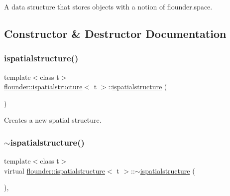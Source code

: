 A data structure that stores objects with a notion of flounder.\+space. 



\subsection{Constructor \& Destructor Documentation}
\mbox{\label{classflounder_1_1ispatialstructure_a0dbd26803384536ee69667f057b0d436}} 
\subsubsection{\texorpdfstring{ispatialstructure()}{ispatialstructure()}}
{\footnotesize\ttfamily template$<$class t$>$ \\
\hyperlink{classflounder_1_1ispatialstructure}{flounder\+::ispatialstructure}$<$ t $>$\+::\hyperlink{classflounder_1_1ispatialstructure}{ispatialstructure} (\begin{DoxyParamCaption}{ }\end{DoxyParamCaption})\hspace{0.3cm}{\ttfamily [inline]}}



Creates a new spatial structure. 

\mbox{\label{classflounder_1_1ispatialstructure_a355b10082dc172d15e1adbadba6c7f2b}} 
\subsubsection{\texorpdfstring{$\sim$ispatialstructure()}{~ispatialstructure()}}
{\footnotesize\ttfamily template$<$class t$>$ \\
virtual \hyperlink{classflounder_1_1ispatialstructure}{flounder\+::ispatialstructure}$<$ t $>$\+::$\sim$\hyperlink{classflounder_1_1ispatialstructure}{ispatialstructure} (\begin{DoxyParamCaption}{ }\end{DoxyParamCaption})\hspace{0.3cm}{\ttfamily [inline]}, {\ttfamily [virtual]}}



